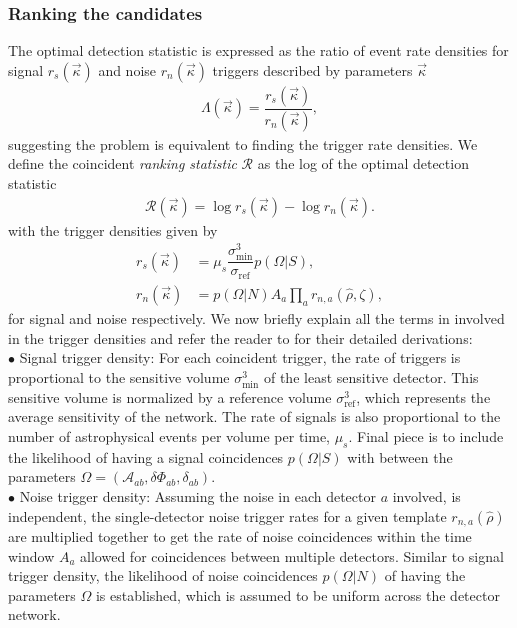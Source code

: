 \subsubsection{Ranking the candidates}
The optimal detection statistic is expressed as the ratio of event rate densities for signal $r_s(\vec{\kappa})$ and noise $r_n(\vec{\kappa})$ triggers described by  parameters $\vec{\kappa}$
\begin{align}
    \Lambda(\vec{\kappa}) = \dfrac{r_s(\vec{\kappa})}{r_n(\vec{\kappa})},
\end{align}
suggesting the problem is equivalent to finding the trigger rate densities. We define the coincident \textit{ranking statistic} $\mathcal{R}$ as the log of the optimal detection statistic
\begin{align}
    \mathcal{R}(\vec{\kappa}) = \log r_s(\vec{\kappa}) - \log r_n(\vec{\kappa}).
\end{align}
with the trigger densities given by 
\begin{align}
    r_s(\vec{\kappa}) &= \mu_s \dfrac{\sigma_{\min}^3}{\sigma_{\text{ref}}}p(\Omega|S),\\
    r_n(\vec{\kappa}) &= p(\Omega|N)A_{{a}}\prod_a r_{n,a}(\hat{\rho},\zeta),
\end{align}
for signal and noise respectively. We now briefly explain all the terms in involved in the trigger densities and refer the reader to \cite{Davies:2020tsx} for their detailed derivations: \\
$\bullet$ Signal trigger density: For each coincident trigger, the rate of triggers is proportional to the sensitive volume $\sigma_{\min}^3$ of the least sensitive detector. This sensitive volume is normalized by a reference volume $\sigma_{\text{ref}}^3$, which represents the average sensitivity of the network. The rate of signals is also proportional to the number of astrophysical events per volume per time, $\mu_s$. Final piece is to include the likelihood of having a signal coincidences $p(\Omega|S)$ with between the parameters $\Omega = (\mathcal{A}_{ab},\delta \Phi_{ab}, \delta_{ab})$.\\
$\bullet$ Noise trigger density: Assuming the noise in each detector {$a$} involved, is independent, the single-detector noise trigger rates for a given template $r_{n,a}(\hat{\rho})$ are multiplied together to get the rate of noise coincidences within the time window $A_a$ allowed for coincidences between multiple detectors. Similar to signal trigger density, the likelihood of noise coincidences $p(\Omega|N)$ of having the parameters $\Omega$ is established, which is assumed to be uniform across the detector network.

